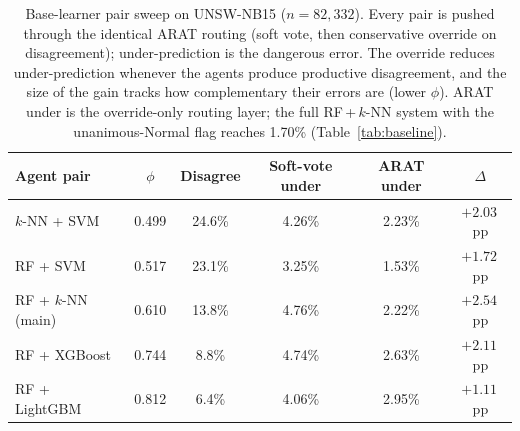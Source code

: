\begin{table}[t]
\centering
\small
\setlength{\tabcolsep}{5pt}
\caption{Base-learner pair sweep on UNSW-NB15 ($n=82{,}332$). Every pair is pushed through the identical ARAT routing (soft vote, then conservative override on disagreement); under-prediction is the dangerous error. The override reduces under-prediction whenever the agents produce productive disagreement, and the size of the gain tracks how complementary their errors are (lower $\phi$). ARAT under is the override-only routing layer; the full RF\,+\,$k$-NN system with the unanimous-Normal flag reaches 1.70\% (Table~\ref{tab:baseline}).}
\label{tab:pairsweep}
\begin{tabular}{lccccc}
\toprule
Agent pair & $\phi$ & Disagree & Soft-vote under & ARAT under & $\Delta$ \\
\midrule
$k$-NN + SVM & 0.499 & 24.6\% & 4.26\% & 2.23\% & $+2.03$\,pp \\
RF + SVM & 0.517 & 23.1\% & 3.25\% & 1.53\% & $+1.72$\,pp \\
RF + $k$-NN (main) & 0.610 & 13.8\% & 4.76\% & 2.22\% & $+2.54$\,pp \\
RF + XGBoost & 0.744 & 8.8\% & 4.74\% & 2.63\% & $+2.11$\,pp \\
RF + LightGBM & 0.812 & 6.4\% & 4.06\% & 2.95\% & $+1.11$\,pp \\
\bottomrule
\end{tabular}
\end{table}